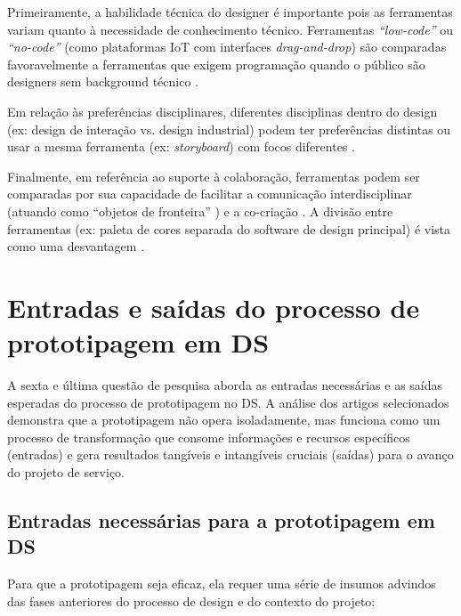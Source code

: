 Primeiramente, a habilidade técnica do designer é importante pois as ferramentas variam quanto à necessidade de conhecimento técnico. Ferramentas \textit{``low-code''} ou \textit{``no-code''} (como plataformas IoT com interfaces \textit{drag-and-drop}) são comparadas favoravelmente a ferramentas que exigem programação quando o público são designers sem background técnico \cite{Kim2024}.

Em relação às preferências disciplinares, diferentes disciplinas dentro do design (ex: design de interação vs. design industrial) podem ter preferências distintas ou usar a mesma ferramenta (ex: \textit{storyboard}) com focos diferentes \cite{wang2023smartproducts}.

Finalmente, em referência ao suporte à colaboração, ferramentas podem ser comparadas por sua capacidade de facilitar a comunicação interdisciplinar (atuando como ``objetos de fronteira'' \cite{paust2025integrative}) e a co-criação \cite{soto2023prototyping}. A divisão entre ferramentas (ex: paleta de cores separada do software de design principal) é vista como uma desvantagem \cite{hegemann2024palette}.



\section{Entradas e saídas do processo de prototipagem em DS}

A sexta e última questão de pesquisa aborda as entradas necessárias e as saídas esperadas do processo de prototipagem no DS. A análise dos artigos selecionados demonstra que a prototipagem não opera isoladamente, mas funciona como um processo de transformação que consome informações e recursos específicos (entradas) e gera resultados tangíveis e intangíveis cruciais (saídas) para o avanço do projeto de serviço.

\subsection{Entradas necessárias para a prototipagem em DS}

Para que a prototipagem seja eficaz, ela requer uma série de insumos advindos das fases anteriores do processo de design e do contexto do projeto:


